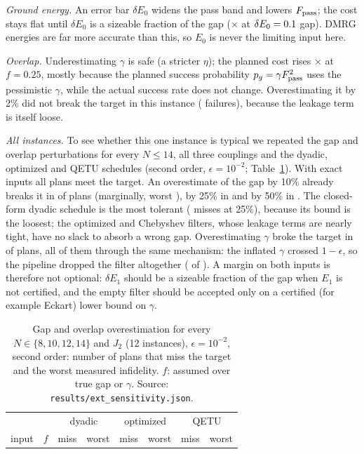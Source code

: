 \documentclass[aps,pra,twocolumn,superscriptaddress,nofootinbib]{revtex4-2}
\begin{document}
\emph{Ground energy.} An error bar $\delta E_0$ widens the pass band and lowers $F_{\rm pass}$; the
cost stays flat until $\delta E_0$ is a sizeable fraction of the gap (\eZeroHiCost$\times$ at
$\delta E_0=0.1$ gap). DMRG energies are far more accurate than this, so $E_0$ is never the
limiting input here.

\emph{Overlap.} Underestimating $\gamma$ is safe (a stricter $\eta$); the planned cost rises
\gammaLowCost$\times$ at $f=0.25$, mostly because the planned success probability $p_g=\gamma F_{\rm
pass}^2$ uses the pessimistic $\gamma$, while the actual success rate does not change. Overestimating
it by 2\% did not break the target in this instance (\nGammaFail{} failures), because the leakage term
is itself loose.

\emph{All instances.} To see whether this one instance is typical we repeated the gap and overlap
perturbations for every $N\le14$, all three couplings and the dyadic, optimized and QETU schedules
(second order, $\epsilon=10^{-2}$; Table~\ref{tab:senswide}). With exact inputs all \sensGapN{} plans
meet the target. An overestimate of the gap by 10\% already breaks it in \sensGapOneTenMiss{} of
\sensGapN{} plans (marginally, worst \sensGapOneTenWorst), by 25\% in \sensGapOneQuarterMiss{} and by
50\% in \sensGapOneHalfMiss. The closed-form dyadic schedule is the most tolerant
(\sensDyaQuarterMiss{} misses at 25\%), because its bound is the loosest; the optimized and Chebyshev
filters, whose leakage terms are nearly tight, have no slack to absorb a wrong gap. Overestimating
$\gamma$ broke the target in \sensGammaMiss{} of \sensGammaN{} plans, all of them through the same
mechanism: the inflated $\gamma$ crossed $1-\epsilon$, so the pipeline dropped the filter altogether
(\sensGammaNoFilter{} of \sensGammaMiss). A margin on both inputs is therefore not optional: $\delta E_1$
should be a sizeable fraction of the gap when $E_1$ is not certified, and the empty filter should be
accepted only on a certified (for example Eckart) lower bound on $\gamma$.

\begin{table}[t]
\caption{Gap and overlap overestimation for every $N\in\{8,10,12,14\}$ and $J_2$ (12 instances),
$\epsilon=10^{-2}$, second order: number of plans that miss the target and the worst measured
infidelity. $f$: assumed over true gap or $\gamma$. Source: \texttt{results/ext\_sensitivity.json}.}
\label{tab:senswide}
\begin{ruledtabular}
\begin{tabular}{lrrrrrrr}
 & & \multicolumn{2}{c}{dyadic} & \multicolumn{2}{c}{optimized} & \multicolumn{2}{c}{QETU}\\
input & $f$ & miss & worst & miss & worst & miss & worst\\
\midrule

\end{tabular}
\end{ruledtabular}
\end{table}
\end{document}
